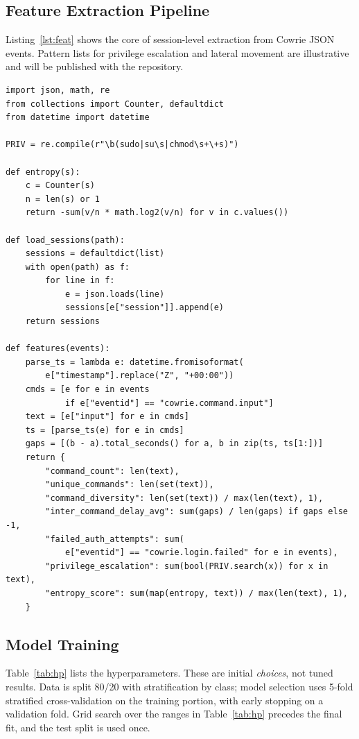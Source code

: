 \documentclass[conference]{IEEEtran}
\begin{document}
\subsection{Feature Extraction Pipeline}
Listing~\ref{lst:feat} shows the core of session-level extraction from Cowrie JSON events. Pattern lists for privilege escalation and lateral movement are illustrative and will be published with the repository.

\begin{lstlisting}[float=t,caption={Session feature extraction (excerpt).},label={lst:feat}]
import json, math, re
from collections import Counter, defaultdict
from datetime import datetime

PRIV = re.compile(r"\b(sudo|su\s|chmod\s+\+s)")

def entropy(s):
    c = Counter(s)
    n = len(s) or 1
    return -sum(v/n * math.log2(v/n) for v in c.values())

def load_sessions(path):
    sessions = defaultdict(list)
    with open(path) as f:
        for line in f:
            e = json.loads(line)
            sessions[e["session"]].append(e)
    return sessions

def features(events):
    parse_ts = lambda e: datetime.fromisoformat(
        e["timestamp"].replace("Z", "+00:00"))
    cmds = [e for e in events
            if e["eventid"] == "cowrie.command.input"]
    text = [e["input"] for e in cmds]
    ts = [parse_ts(e) for e in cmds]
    gaps = [(b - a).total_seconds() for a, b in zip(ts, ts[1:])]
    return {
        "command_count": len(text),
        "unique_commands": len(set(text)),
        "command_diversity": len(set(text)) / max(len(text), 1),
        "inter_command_delay_avg": sum(gaps) / len(gaps) if gaps else -1,
        "failed_auth_attempts": sum(
            e["eventid"] == "cowrie.login.failed" for e in events),
        "privilege_escalation": sum(bool(PRIV.search(x)) for x in text),
        "entropy_score": sum(map(entropy, text)) / max(len(text), 1),
    }
\end{lstlisting}

\subsection{Model Training}\label{sec:training}
Table~\ref{tab:hp} lists the hyperparameters. These are initial \emph{choices}, not tuned results. Data is split 80/20 with stratification by class; model selection uses 5-fold stratified cross-validation on the training portion, with early stopping on a validation fold. Grid search over the ranges in Table~\ref{tab:hp} precedes the final fit, and the test split is used once.
\end{document}

